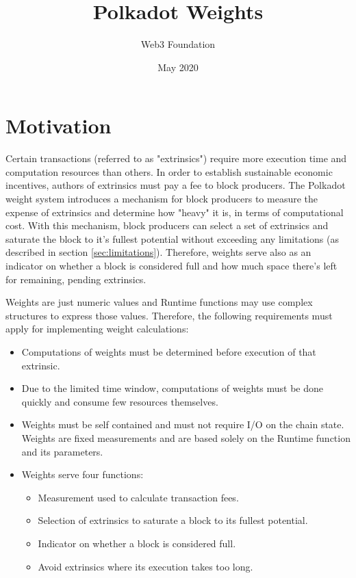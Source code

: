 \documentclass[11pt,a4paper]{article}
\begin{document}
\title{Polkadot Weights}
\author{Web3 Foundation}
\date{May 2020}
\maketitle

\section{Motivation}
Certain transactions (referred to as "extrinsics") require more execution time
and computation resources than others. In order to establish sustainable
economic incentives, authors of extrinsics must pay a fee to block producers.
The Polkadot weight system introduces a mechanism for block producers to measure
the expense of extrinsics and determine how "heavy" it is, in terms of
computational cost. With this mechanism, block producers can select a set of
extrinsics and saturate the block to it's fullest potential without exceeding
any limitations (as described in section \ref{sec:limitations}). Therefore,
weights serve also as an indicator on whether a block is considered full and how
much space there's left for remaining, pending extrinsics.
\newline

Weights are just numeric values and Runtime functions may use complex structures
to express those values. Therefore, the following requirements must apply for
implementing weight calculations:
\begin{itemize}
\item Computations of weights must be determined before execution of that
extrinsic.
\item Due to the limited time window, computations of weights must be done
      quickly and consume few resources themselves.
\item Weights must be self contained and must not require I/O on the chain
      state. Weights are fixed measurements and are based solely on the Runtime
      function and its parameters.
\item Weights serve four functions:
  \begin{itemize}
    \item Measurement used to calculate transaction fees.
    \item Selection of extrinsics to saturate a block to its fullest potential.
    \item Indicator on whether a block is considered full.
    \item Avoid extrinsics where its execution takes too long.
  \end{itemize}
\end{itemize}
\end{document}
